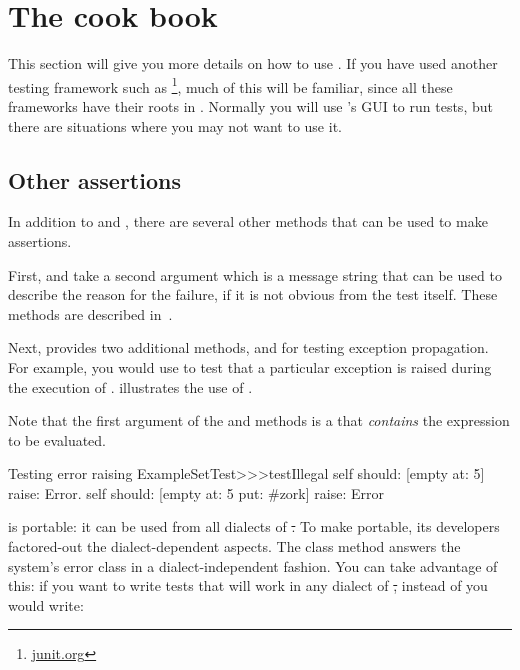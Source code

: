 \documentclass[a4paper,10pt,twoside]{book}
\begin{document}

\section{The \SUnit cook book}
This section will give you more details on how to use \SUnit.  If you
have used another testing framework such as \JUnit\footnote{\url{junit.org}},
much of this will be familiar, since all these frameworks have their roots in \SUnit.
Normally you will use \SUnit's GUI to run tests, but there are
situations where you may not want to use it.
\subsection{Other assertions}
In addition to  and , there are several other methods that can be used to make assertions.

First,  and  take a second argument which is a message string that can be used to describe the reason for the failure, if it is not obvious from the test itself.   These methods are described in~.

Next, \sunit provides two additional methods,  and
 for testing exception propagation.
For example, you would use 
 to test that a particular exception is raised during the execution of .  
illustrates the use of \mbox{.}

Note that the first argument of the  and  methods is a  that \emph{contains} the expression to be evaluated.   

\begin{method}[ESTtestIllegal]{Testing error raising}
ExampleSetTest>>>testIllegal
	self should: [empty at: 5] raise: Error.
	self should: [empty at: 5 put: #zork] raise: Error
\end{method}

\sunit is portable: it can be used from all dialects of \st.  To make
\sunit portable, its developers factored-out the dialect-dependent aspects.  The class method  answers
the system's error class in a dialect-independent fashion. 
You can take advantage of this: if you want to write tests that will work in any dialect of \st, instead of 
 you would write:
\end{document}
